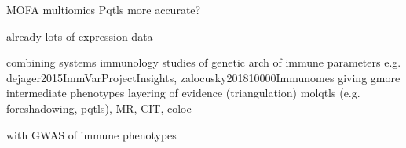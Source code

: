 \begin{outline}

    MOFA
    multiomics
        Pqtls more accurate?

    already lots of expression data

    combining systems immunology studies of genetic arch of immune parameters
            e.g. dejager2015ImmVarProjectInsights, zalocusky201810000Immunomes
        giving gmore intermediate phenotypes
        layering of evidence (triangulation)
            molqtls (e.g. foreshadowing, pqtls), MR, CIT, coloc

    with GWAS of immune phenotypes

%
%
%
%
%
%
%
%
%


\end{outline}
